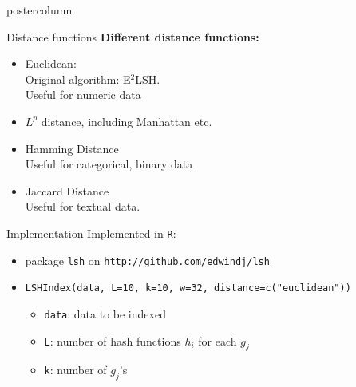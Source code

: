 \documentclass[final,hyperref={pdfpagelabels=false}]{beamer}
\newlength{\columnheight}
\begin{document}
\begin{frame}
\begin{columns}
    \begin{column}{.49\textwidth}
      \begin{beamercolorbox}[center,wd=\textwidth]{postercolumn}
        \begin{minipage}[T]{.95\textwidth} %
          \parbox[t][\columnheight]{\textwidth}{ %
            \begin{block}{Distance functions}
            {\bf\Large Different distance functions:}
            \begin{itemize}
             \item Euclidean: \\
             Original algorithm: E$^2$LSH.\\
             Useful for numeric data
             \item $L^p$ distance, including Manhattan etc.
             \item Hamming Distance \\
             Useful for categorical, binary data
             \item Jaccard Distance \\
             Useful for textual data.
            \end{itemize}
            \end{block}
            \vfill
            \begin{block}{Implementation}
              Implemented in {\tt R}:
              \begin{itemize}
                \item package {\tt lsh} on {\tt http://github.com/edwindj/lsh}~\\
                \item {\tt LSHIndex(data, L=10, k=10, w=32, distance=c("euclidean"))} ~\\
                  \begin{itemize}
                    \item {\tt data}: data to be indexed
                    \item {\tt L}: number of hash functions $h_i$ for each $g_j$
                    \item {\tt k}: number of $g_j$'s

\end{itemize}
\end{itemize}
\end{block}}
\end{minipage}
\end{beamercolorbox}
\end{column}
\end{columns}
\end{frame}
\end{document}
